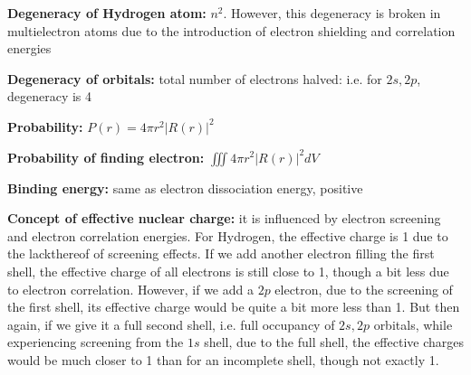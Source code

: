 \documentclass[11pt,fleqn]{book}
\begin{document}
\textbf{Degeneracy of Hydrogen atom: }$n^2$. However, this degeneracy is broken in multielectron atoms due to the introduction of electron shielding and correlation energies

\textbf{Degeneracy of orbitals: }total number of electrons halved: i.e. for $2s,2p$, degeneracy is 4

\textbf{Probability: }$P(r)=4\pi r^2|R(r)|^2$

\textbf{Probability of finding electron: }$\iiint4\pi r^2|R(r)|^2dV$

\textbf{Binding energy: }same as electron dissociation energy, positive

\textbf{Concept of effective nuclear charge: }it is influenced by electron screening and electron correlation energies. For Hydrogen, the effective charge is 1 due to the lackthereof of screening effects. If we add another electron filling the first shell, the effective charge of all electrons is still close to 1, though a bit less due to electron correlation. However, if we add a $2p$ electron, due to the screening of the first shell, its effective charge would be quite a bit more less than 1. But then again, if we give it a full second shell, i.e. full occupancy of $2s,2p$ orbitals, while experiencing screening from the $1s$ shell, due to the full shell, the effective charges would be much closer to 1 than for an incomplete shell, though not exactly 1.
\end{document}
